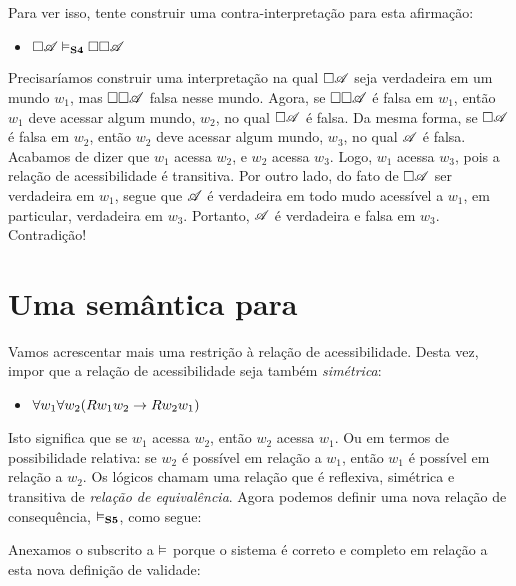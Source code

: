 Para ver isso,  tente construir uma contra-interpretação para esta afirmação:
\begin{itemize}
	\item[]$\Box\mathscr{A} \vDash_{\mathbf{S4}} \Box \Box \mathscr{A}$
\end{itemize}
Precisaríamos construir uma interpretação na qual $\Box\mathscr{A}$ seja verdadeira em um mundo  $w_1$, mas  $\Box \Box \mathscr{A}$  falsa nesse mundo. Agora, se $\Box \Box \mathscr{A}$  é falsa em  $w_1$, então  $w_1$ deve acessar algum mundo, $w_2$, no qual $\Box\mathscr{A}$ é falsa. Da mesma forma, se $\Box \mathscr{A}$ é falsa em $w_2$, então $w_2$ deve acessar algum mundo, $w_3$, no qual $\mathscr{A}$ é falsa. Acabamos de dizer que  $w_1$ acessa $w_2$, e $w_2$ acessa $w_3$. Logo,  $w_1$ acessa $w_3$, pois a relação de acessibilidade é  transitiva.  Por outro lado, do fato de $\Box\mathscr{A}$  ser verdadeira em $w_1$, segue que   $\mathscr{A}$  é verdadeira em todo mudo acessível a $w_1$, em particular, verdadeira em $w_3$.  Portanto, $\mathscr{A}$ é verdadeira e falsa em $w_3$. Contradição!

\section{Uma semântica para  \mlSfive}
\label{SemanticsS5}

Vamos acrescentar mais uma restrição à relação de acessibilidade. Desta vez, impor que a relação de acessibilidade seja também \emph{simétrica}:
\begin{itemize}
	\item $\forall w_1\forall w_2(Rw_1w_2 \rightarrow Rw_2w_1)$
\end{itemize}
Isto significa que se  $w_1$ acessa $w_2$, então $w_2$ acessa  $w_1$. Ou em termos de possibilidade relativa: se $w_2$ é possível em relação a  $w_1$, então  $w_1$ é possível em relação a $w_2$. Os lógicos chamam uma relação que é reflexiva, simétrica e transitiva de \emph{relação de equivalência}. Agora podemos  definir uma nova relação de consequência, $\vDash_{\mathbf{S5}} $, como segue:

 

Anexamos o subscrito \mlSfive{} a $\vDash$ porque  o sistema \mlSfive{} é correto e completo em relação a esta nova definição de validade:


